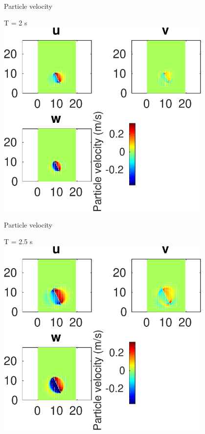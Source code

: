 \documentclass{beamer}
\begin{document}
\begin{frame}
 {Particle velocity}
 
 \centering \Large T = 2 s\\
 \includegraphics[width=0.8\textwidth]{images/horizontal_velo_00026}
 
\end{frame}

\begin{frame}
 {Particle velocity}
 
 \centering \Large T = 2.5 s\\
 \includegraphics[width=0.8\textwidth]{images/horizontal_velo_00031}
 
\end{frame}
\end{document}
